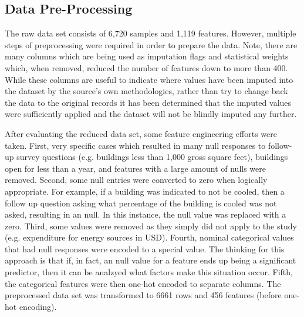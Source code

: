 \subsection{Data Pre-Processing}

The raw data set consists of 6,720 samples and 1,119 features.  However, multiple steps of preprocessing were required in order to prepare the data.  Note, there are many columns which are being used as imputation flags and statistical weights which, when removed, reduced the number of features down to more than 400.  While these columns are useful to indicate where values have been imputed into the dataset by the source's own methodologies, rather than try to change back the data to the original records it has been determined that the imputed values were sufficiently applied and the dataset will not be blindly imputed any further.

After evaluating the reduced data set, some feature engineering efforts were taken.  First, very specific cases which resulted in many null responses to follow-up survey questions (e.g. buildings less than 1,000 gross square feet), buildings open for less than a year, and features with a large amount of nulls were removed.  Second, some null entries were converted to zero when logically appropriate.  For example, if a building was indicated to not be cooled, then a follow up question asking what percentage of the building is cooled was not asked, resulting in an null.  In this instance, the null value was replaced with a zero.  Third, some values were removed as they simply did not apply to the study (e.g. expenditure for energy sources in USD).  Fourth, nominal categorical values that had null responses were encoded to a special value.  The thinking for this approach is that if, in fact, an null value for a feature ends up being a significant predictor, then it can be analzyed what factors make this situation occur.  Fifth, the categorical features were then one-hot encoded to separate columns.  The preprocessed data set was transformed to 6661 rows and 456 features (before one-hot encoding).